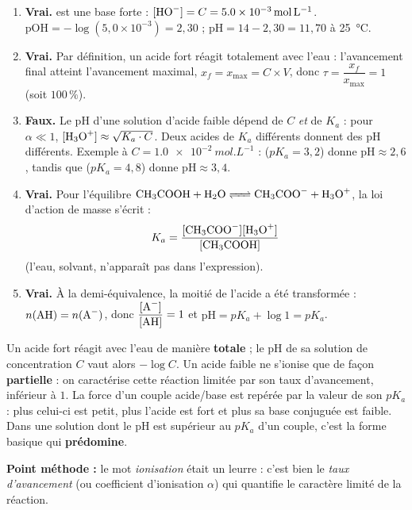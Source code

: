 \documentclass[11pt]{article}
\newcommand{\cle}[1]{{\popxbold\color{popdark}#1}}
\begin{document}
\begin{corrige}
\begin{enumerate}
\item \textbf{Vrai.}  est une \cle{base forte} : $[\ce{HO-}] = C = \SI{5,0e-3}{mol.L^{-1}}$.
$\mathrm{pOH} = -\log(5{,}0\times10^{-3}) = 2{,}30$ ; $\mathrm{pH} = 14 - 2{,}30 = 11{,}70$ à \SI{25}{\celsius}.

\item \textbf{Vrai.} Par définition, un acide fort réagit totalement avec l'eau : l'avancement final atteint l'avancement maximal, $x_f = x_{\max} = C \times V$, donc $\tau = \dfrac{x_f}{x_{\max}} = 1$ (soit $100\,\%$).

\item \textbf{Faux.} Le pH d'une solution d'acide faible dépend de $C$ \emph{et} de $K_a$ : pour $\alpha \ll 1$, $[\ce{H3O+}] \approx \sqrt{K_a \cdot C}$. Deux acides de $K_a$ différents donnent des pH différents. Exemple à $C = \SI{1,0e-2}{mol.L^{-1}}$ :  ($pK_a = 3{,}2$) donne $\mathrm{pH} \approx 2{,}6$, tandis que  ($pK_a = 4{,}8$) donne $\mathrm{pH} \approx 3{,}4$.

\item \textbf{Vrai.} Pour l'équilibre $\ce{CH3COOH + H2O <=> CH3COO- + H3O+}$, la \cle{loi d'action de masse} s'écrit :
\[ K_a = \frac{[\ce{CH3COO-}][\ce{H3O+}]}{[\ce{CH3COOH}]} \]
(l'eau, solvant, n'apparaît pas dans l'expression).

\item \textbf{Vrai.} À la \cle{demi-équivalence}, la moitié de l'acide a été transformée : $n(\ce{AH}) = n(\ce{A-})$, donc $\dfrac{[\ce{A-}]}{[\ce{AH}]} = 1$ et $\mathrm{pH} = pK_a + \log 1 = pK_a$.
\end{enumerate}
\end{corrige}

\begin{corrige}
Un \cle{acide fort} réagit avec l'eau de manière \textbf{totale} ; le pH de sa solution de concentration $C$ vaut alors \textbf{$-\log C$}. Un \cle{acide faible} ne s'ionise que de façon \textbf{partielle} : on caractérise cette réaction limitée par son \cle{taux d'avancement}, inférieur à $1$. La force d'un \cle{couple acide/base} est repérée par la valeur de son \textbf{$pK_a$} : plus celui-ci est petit, plus l'acide est fort et plus sa \cle{base conjuguée} est faible. Dans une solution dont le pH est supérieur au $pK_a$ d'un couple, c'est la forme basique qui \textbf{prédomine}.

\medskip
\textbf{Point méthode :} le mot \emph{ionisation} était un leurre : c'est bien le \emph{taux d'avancement} (ou \cle{coefficient d'ionisation} $\alpha$) qui quantifie le caractère limité de la réaction.
\end{corrige}
\end{document}
